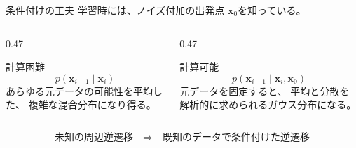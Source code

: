 \begin{frame}{条件付けの工夫}
    学習時には、ノイズ付加の出発点
    $\boldsymbol{x}_0$を知っている。
    \begin{columns}[T,onlytextwidth]
        \begin{column}{0.47\textwidth}
            \begin{alertblock}{計算困難}
                \[
                    p(\boldsymbol{x}_{i-1}\mid\boldsymbol{x}_i)
                \]
                あらゆる元データの可能性を平均した、
                複雑な混合分布になり得る。
            \end{alertblock}
        \end{column}
        \begin{column}{0.47\textwidth}
            \begin{exampleblock}{計算可能}
                \[
                    p(\boldsymbol{x}_{i-1}
                    \mid\boldsymbol{x}_i,\boldsymbol{x}_0)
                \]
                元データを固定すると、
                平均と分散を解析的に求められるガウス分布になる。
            \end{exampleblock}
        \end{column}
    \end{columns}
    \vfill
    \[
        \text{未知の周辺逆遷移}
        \quad\Longrightarrow\quad
        \text{既知のデータで条件付けた逆遷移}
    \]
\end{frame}
